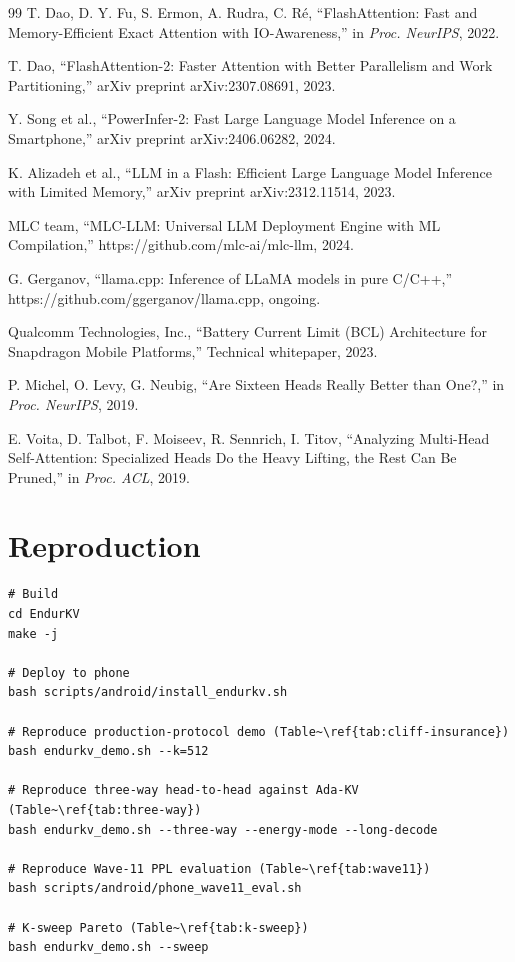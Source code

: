 \documentclass[sigconf, anonymous=false, screen=true]{acmart}
\begin{document}
\begin{thebibliography}{99}
T. Dao, D. Y. Fu, S. Ermon, A. Rudra, C. R\'e,
``FlashAttention: Fast and Memory-Efficient Exact Attention with IO-Awareness,''
in \emph{Proc. NeurIPS}, 2022.

T. Dao,
``FlashAttention-2: Faster Attention with Better Parallelism and Work Partitioning,''
arXiv preprint arXiv:2307.08691, 2023.

Y. Song et al.,
``PowerInfer-2: Fast Large Language Model Inference on a Smartphone,''
arXiv preprint arXiv:2406.06282, 2024.

K. Alizadeh et al.,
``LLM in a Flash: Efficient Large Language Model Inference with Limited Memory,''
arXiv preprint arXiv:2312.11514, 2023.

MLC team,
``MLC-LLM: Universal LLM Deployment Engine with ML Compilation,''
https://github.com/mlc-ai/mlc-llm, 2024.

G. Gerganov,
``llama.cpp: Inference of LLaMA models in pure C/C++,''
https://github.com/ggerganov/llama.cpp, ongoing.

Qualcomm Technologies, Inc.,
``Battery Current Limit (BCL) Architecture for Snapdragon Mobile Platforms,''
Technical whitepaper, 2023.

P. Michel, O. Levy, G. Neubig,
``Are Sixteen Heads Really Better than One?,''
in \emph{Proc. NeurIPS}, 2019.

E. Voita, D. Talbot, F. Moiseev, R. Sennrich, I. Titov,
``Analyzing Multi-Head Self-Attention: Specialized Heads Do the Heavy Lifting, the Rest Can Be Pruned,''
in \emph{Proc. ACL}, 2019.

\end{thebibliography}

\appendix

\section{Reproduction}

\begin{lstlisting}[basicstyle=\ttfamily\footnotesize]
# Build
cd EndurKV
make -j

# Deploy to phone
bash scripts/android/install_endurkv.sh

# Reproduce production-protocol demo (Table~\ref{tab:cliff-insurance})
bash endurkv_demo.sh --k=512

# Reproduce three-way head-to-head against Ada-KV (Table~\ref{tab:three-way})
bash endurkv_demo.sh --three-way --energy-mode --long-decode

# Reproduce Wave-11 PPL evaluation (Table~\ref{tab:wave11})
bash scripts/android/phone_wave11_eval.sh

# K-sweep Pareto (Table~\ref{tab:k-sweep})
bash endurkv_demo.sh --sweep
\end{lstlisting}
\end{document}
